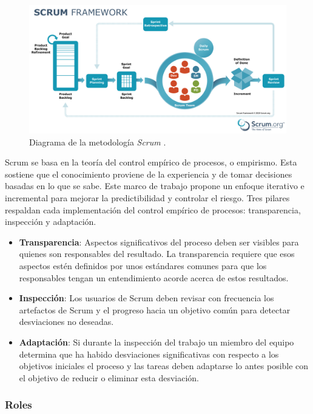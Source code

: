\noindent\begin{figure}[hp!]
  \centering
    \includegraphics[width=\textwidth]{imaxes/scrum.pdf}
  \caption{Diagrama de la metodología \textit{Scrum} \citep{scrumorg}.}
  \label{fig:scrum}
\end{figure}

Scrum se basa en la teoría del control empírico de procesos, o empirismo. Esta sostiene que el conocimiento proviene de la experiencia y de tomar decisiones basadas en lo que se sabe. Este marco de trabajo propone un enfoque iterativo e incremental para mejorar la predictibilidad y controlar el riesgo. Tres pilares respaldan cada implementación del control empírico de procesos: transparencia, inspección y adaptación.

\begin{itemize}
    \item \textbf{Transparencia}: Aspectos significativos del proceso deben ser visibles para quienes son responsables del resultado. La transparencia requiere que esos aspectos estén definidos por unos estándares comunes para que los responsables tengan un entendimiento acorde acerca de estos resultados.
    \item \textbf{Inspección}: Los usuarios de Scrum deben revisar con frecuencia los artefactos de Scrum y el progreso hacia un objetivo común para detectar desviaciones no deseadas.
    \item \textbf{Adaptación}: Si durante la inspección del trabajo un miembro del equipo determina que ha habido desviaciones significativas con respecto a los objetivos iniciales el proceso y las tareas deben adaptarse lo antes posible con el objetivo de reducir o eliminar esta desviación.
\end{itemize}

\subsubsection{Roles}


